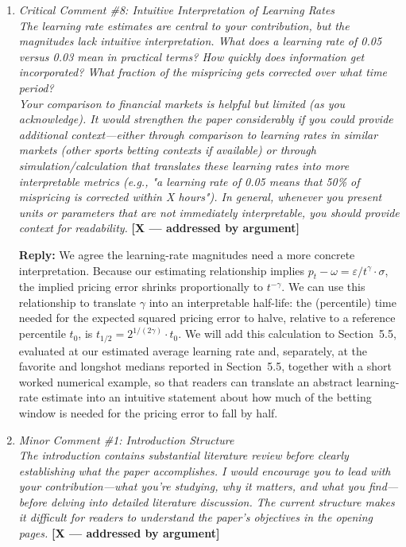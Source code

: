 \documentclass[letterpaper,12pt]{article}
\newcounter{b}
\newcommand{\argX}{\textcolor{green!55!black}{\textbf{[X --- addressed by argument]}}}
\newcommand{\Reply}[1]{\par\noindent\textbf{Reply:} #1}
\begin{document}
\begin{enumerate}
\item \textit{Critical Comment \#8: Intuitive Interpretation of Learning Rates\\[6pt]
The learning rate estimates are central to your contribution, but the magnitudes lack intuitive interpretation. What does a learning rate of 0.05 versus 0.03 mean in practical terms? How quickly does information get incorporated? What fraction of the mispricing gets corrected over what time period?\\[6pt]
Your comparison to financial markets is helpful but limited (as you acknowledge). It would strengthen the paper considerably if you could provide additional context—either through comparison to learning rates in similar markets (other sports betting contexts if available) or through simulation/calculation that translates these learning rates into more interpretable metrics (e.g., "a learning rate of 0.05 means that 50\% of mispricing is corrected within X hours"). In general, whenever you present units or parameters that are not immediately interpretable, you should provide context for readability.} \argX

\Reply{We agree the learning-rate magnitudes need a more concrete interpretation. Because our estimating relationship implies $p_t - \omega = \varepsilon / t^\gamma \cdot \sigma$, the implied pricing error shrinks proportionally to $t^{-\gamma}$. We can use this relationship to translate $\gamma$ into an interpretable half-life: the (percentile) time needed for the expected squared pricing error to halve, relative to a reference percentile $t_0$, is $t_{1/2} = 2^{1/(2\gamma)} \cdot t_0$. We will add this calculation to Section~5.5, evaluated at our estimated average learning rate and, separately, at the favorite and longshot medians reported in Section~5.5, together with a short worked numerical example, so that readers can translate an abstract learning-rate estimate into an intuitive statement about how much of the betting window is needed for the pricing error to fall by half.}



\item \textit{Minor Comment \#1: Introduction Structure\\[6pt]
The introduction contains substantial literature review before clearly establishing what the paper accomplishes. I would encourage you to lead with your contribution—what you're studying, why it matters, and what you find—before delving into detailed literature discussion. The current structure makes it difficult for readers to understand the paper's objectives in the opening pages.} \argX


\end{enumerate}
\end{document}

